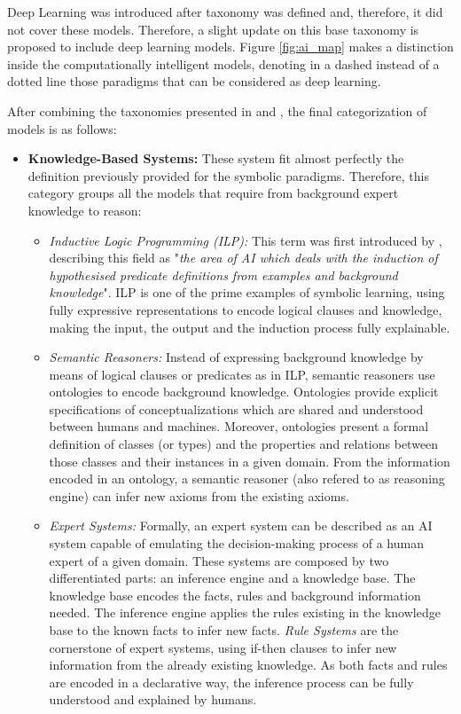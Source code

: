 Deep Learning was introduced after \citep{hopgood_2009_knowledge-based} taxonomy was defined and, therefore, it did not cover these models. Therefore, a slight update on this base taxonomy is proposed to include deep learning models. Figure \ref{fig:ai_map} makes a distinction inside the computationally intelligent models, denoting in a dashed instead of a dotted line those paradigms that can be considered as deep learning. 

After combining the taxonomies presented in \citep{hopgood_2009_knowledge-based} and \citep{corea_ai_2019}, the final categorization of models is as follows:
\begin{itemize}
    \item \textbf{Knowledge-Based Systems:} These system fit almost perfectly the definition previously provided for the symbolic paradigms. Therefore, this category groups all the models that require from background expert knowledge to reason:
    \begin{itemize}
        \item \textit{Inductive Logic Programming (ILP):} This term was first introduced by \citep{Muggleton1991}, describing this field as "\textit{the area of AI which deals with the induction of hypothesised predicate definitions from examples and background knowledge}". ILP is one of the prime examples of symbolic learning, using fully expressive representations to encode logical clauses and knowledge, making the input, the output and the induction process fully explainable.
        \item \textit{Semantic Reasoners:} Instead of expressing background knowledge by means of logical clauses or predicates as in ILP, semantic reasoners use ontologies to encode background knowledge. Ontologies \citep{noy2001ontology} provide explicit specifications of conceptualizations which are shared and understood between humans and machines. Moreover, ontologies present a formal definition of classes (or types) and the properties and relations between those classes and their instances in a given domain. From the information encoded in an ontology, a semantic reasoner (also refered to as reasoning engine) can infer new axioms from the existing axioms.
        \item \textit{Expert Systems:} Formally, an expert system can be described as an AI system capable of emulating the decision-making process of a human expert of a given domain. These systems are composed by two differentiated parts: an inference engine and a knowledge base. The knowledge base encodes the facts, rules and background information needed. The inference engine applies the rules existing in the knowledge base to the known facts to infer new facts. \textit{Rule Systems} are the cornerstone of expert systems, using if-then clauses to infer new information from the already existing knowledge. As both facts and rules are encoded in a declarative way, the inference process can be fully understood and explained by humans. 
        

\end{itemize}
\end{itemize}
